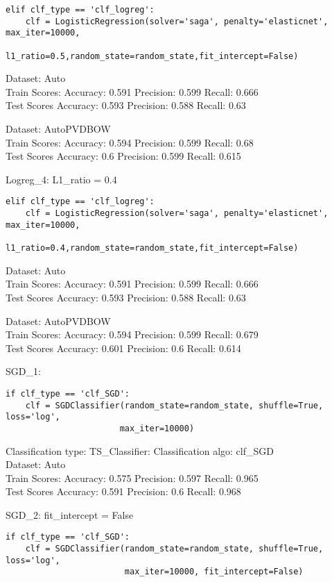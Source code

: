\documentclass[11pt,preprint, authoryear]{elsarticle}
\numberwithin{equation}{section}
\numberwithin{figure}{section}
\numberwithin{table}{section}
\begin{document}
\begin{verbatim}
elif clf_type == 'clf_logreg':
    clf = LogisticRegression(solver='saga', penalty='elasticnet', max_iter=10000,
                      l1_ratio=0.5,random_state=random_state,fit_intercept=False)
\end{verbatim}

Dataset: Auto\\
Train Scores: Accuracy: 0.591 Precision: 0.599 Recall: 0.666\\
Test Scores Accuracy: 0.593 Precision: 0.588 Recall: 0.63

Dataset: AutoPVDBOW\\
Train Scores: Accuracy: 0.594 Precision: 0.599 Recall: 0.68\\
Test Scores Accuracy: 0.6 Precision: 0.599 Recall: 0.615

Logreg\_4: L1\_ratio = 0.4

\begin{verbatim}
elif clf_type == 'clf_logreg':
    clf = LogisticRegression(solver='saga', penalty='elasticnet', max_iter=10000,
                      l1_ratio=0.4,random_state=random_state,fit_intercept=False)
\end{verbatim}

Dataset: Auto\\
Train Scores: Accuracy: 0.591 Precision: 0.599 Recall: 0.666\\
Test Scores Accuracy: 0.593 Precision: 0.588 Recall: 0.63

Dataset: AutoPVDBOW\\
Train Scores: Accuracy: 0.594 Precision: 0.599 Recall: 0.679\\
Test Scores Accuracy: 0.601 Precision: 0.6 Recall: 0.614

SGD\_1:

\begin{verbatim}
if clf_type == 'clf_SGD':
    clf = SGDClassifier(random_state=random_state, shuffle=True, loss='log',
                       max_iter=10000)
\end{verbatim}

Classification type: TS\_Classifier: Classification algo: clf\_SGD\\
Dataset: Auto\\
Train Scores: Accuracy: 0.575 Precision: 0.597 Recall: 0.965\\
Test Scores Accuracy: 0.591 Precision: 0.6 Recall: 0.968

SGD\_2: fit\_intercept = False

\begin{verbatim}
if clf_type == 'clf_SGD':
    clf = SGDClassifier(random_state=random_state, shuffle=True, loss='log',
                        max_iter=10000, fit_intercept=False)
\end{verbatim}
\end{document}

